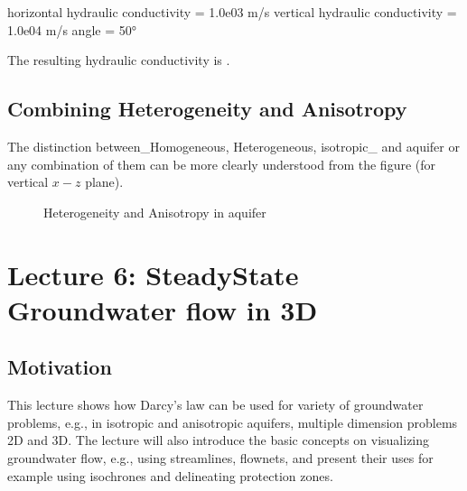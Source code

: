 \documentclass[letterpaper,10pt,english]{sphinxmanual}
\begin{document}
\begin{sphinxVerbatim}[commandchars=\\\{\}]

horizontal hydraulic conductivity = 1.0e\PYGZhy{}03 m/s
vertical hydraulic conductivity = 1.0e\PYGZhy{}04 m/s
angle = 50°


The resulting hydraulic conductivity is .
\end{sphinxVerbatim}


\subsection{Combining Heterogeneity and Anisotropy}
\label{\detokenize{contents/flow/lecture_05/15_het_iso:combining-heterogeneity-and-anisotropy}}
The distinction between\_Homogeneous, Heterogeneous, isotropic\_ and  aquifer or any combination of them can be more clearly understood from the figure (for vertical \(x-z\) plane).

\begin{figure}[htbp]
\centering
\capstart

\noindent{}
\caption{Heterogeneity and Anisotropy in aquifer}\label{\detokenize{contents/flow/lecture_05/15_het_iso:het-aniso}}\end{figure}


\section{Lecture 6: Steady\sphinxhyphen{}State Groundwater flow in 3D}
\label{\detokenize{contents/flow/lecture_06/16_darcy_law_3D:lecture-6-steady-state-groundwater-flow-in-3d}}\label{\detokenize{contents/flow/lecture_06/16_darcy_law_3D::doc}}

\subsection{Motivation}
\label{\detokenize{contents/flow/lecture_06/16_darcy_law_3D:motivation}}
This lecture shows how Darcy’s law can be used for variety of groundwater problems, e.g., in isotropic and anisotropic aquifers, multiple dimension problems \sphinxhyphen{} 2D and 3D. The lecture will also introduce the basic concepts on visualizing groundwater flow, e.g., using streamlines, flow\sphinxhyphen{}nets, and present their uses for example using isochrones and delineating protection zones.
\end{document}
